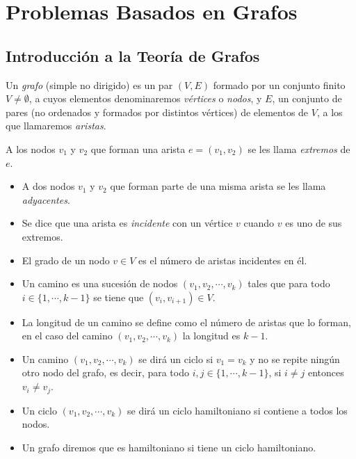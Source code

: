 \chapter{Problemas Basados en Grafos}\label{ch:preliminaresGrafos}

\section{Introducci\'on a la Teoría de Grafos}

\begin{definition}
	Un \textit{grafo} (simple no dirigido) es un par $(V,E)$ formado por un conjunto
	finito $V \neq \emptyset$, a cuyos elementos denominaremos \textit{vértices} o
	\textit{nodos}, y $E$, un conjunto de pares (no ordenados y formados por distintos
	vértices) de elementos de $V$, a los que llamaremos \textit{aristas}.

	A los nodos $v_1$ y $v_2$ que forman una arista $e = (v_1, v_2)$ se les llama
	\textit{extremos} de $e$.
\end{definition}


\begin{definition}[Conceptos]
	\begin{itemize}
	\item A dos nodos $v_1$ y $v_2$ que forman parte de una misma arista se les llama \textit{adyacentes}.
  \item Se dice que una arista es \textit{incidente} con un vértice $v$ cuando $v$ es uno de sus extremos.
	\item El grado de un nodo $v \in V$ es el n\'umero de aristas incidentes en \'el.
  \item Un camino es una sucesi\'on de nodos $(v_1,v_2,\cdots,v_k)$ tales que
	para todo $i \in \{1,\cdots,k-1\}$ se tiene que $(v_i,v_{i+1}) \in V$.
	\item La longitud de un camino se define como el n\'umero de aristas que lo forman,
	en el caso del camino $(v_1,v_2,\cdots,v_k)$ la longitud es $k-1$.
	\item Un camino $(v_1,v_2,\cdots,v_k)$ se dir\'a un ciclo si $v_1 = v_k$ y no
	se repite ning\'un otro nodo del grafo, es decir, para todo $i,j \in
	\{1,\cdots,k-1\}$, si $i\not= j$ entonces $v_i \not= v_j$.
	\item Un ciclo $(v_1,v_2,\cdots,v_k)$ se dir\'a un ciclo hamiltoniano si contiene
	a todos los nodos.
	\item Un grafo diremos que es hamiltoniano si tiene un ciclo hamiltoniano.
\end{itemize}
\end{definition}

